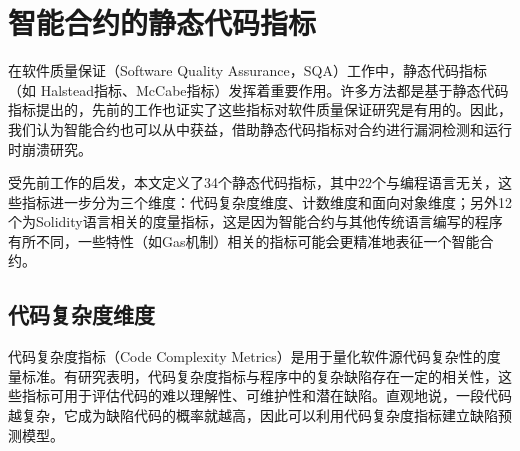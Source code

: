 \section{智能合约的静态代码指标}
\label{sec:智能合约的静态代码指标}
在软件质量保证（Software Quality Assurance，SQA）工作中，静态代码指标（如 Halstead\cite{halstead}指标、McCabe\cite{mccabe}指标）发挥着重要作用。许多方法都是基于静态代码指标提出的，先前的工作\cite{menzies2007data,meyers2007empirical,zimmermann2007predicting}也证实了这些指标对软件质量保证研究是有用的。因此，我们认为智能合约也可以从中获益，借助静态代码指标对合约进行漏洞检测和运行时崩溃研究。

受先前工作\cite{halstead,mccabe,menzies2007data}的启发，本文定义了34个静态代码指标，其中22个与编程语言无关，这些指标进一步分为三个维度：代码复杂度维度、计数维度和面向对象维度；另外12个为Solidity语言相关的度量指标，这是因为智能合约与其他传统语言编写的程序有所不同，一些特性（如Gas机制）相关的指标可能会更精准地表征一个智能合约。


\subsection{代码复杂度维度}
\label{sec:代码复杂度维度}

代码复杂度指标（Code Complexity Metrics）是用于量化软件源代码复杂性的度量标准。有研究表明\cite{Chen2019AnEI,singh2015bug}，代码复杂度指标与程序中的复杂缺陷存在一定的相关性，这些指标可用于评估代码的难以理解性、可维护性和潜在缺陷。直观地说，一段代码越复杂，它成为缺陷代码的概率就越高，因此可以利用代码复杂度指标建立缺陷预测模型。

